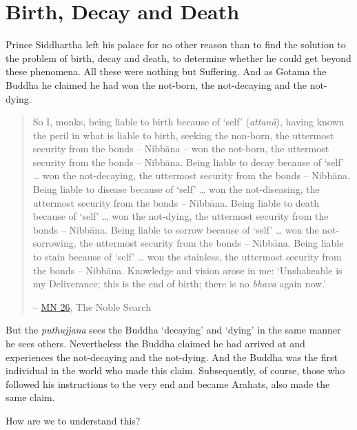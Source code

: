 \chapter{Birth, Decay and Death}

Prince Siddhartha left his palace for no other reason than to find the solution to the problem of birth, decay and death, to determine whether he could get beyond these phenomena. All these were nothing but Suffering. And as Gotama the Buddha he claimed he had won the not-born, the not-decaying and the not-dying.

\begin{quote}
So I, monks, being liable to birth because of `self' (\emph{attanā}), having known the peril in what is liable to birth, seeking the non-born, the uttermost security from the bonds -- Nibbāna -- won the not-born, the uttermost security from the bonds -- Nibbāna. Being liable to decay because of `self' \ldots\hspace{0pt} won the not-decaying, the uttermost security from the bonds -- Nibbāna. Being liable to disease because of `self' \ldots\hspace{0pt} won the not-diseasing, the uttermost security from the bonds -- Nibbāna. Being liable to death because of `self' \ldots\hspace{0pt} won the not-dying, the uttermost security from the bonds -- Nibbāna. Being liable to sorrow because of `self' \ldots\hspace{0pt} won the not-sorrowing, the uttermost security from the bonds -- Nibbāna. Being liable to stain because of `self' \ldots\hspace{0pt} won the stainless, the uttermost security from the bonds -- Nibbāna. Knowledge and vision arose in me: `Unshakeable is my Deliverance; this is the end of birth; there is no \emph{bhava} again now.'

 -- \href{https://suttacentral.net/mn26/en/bodhi}{MN 26}, The Noble Search
\end{quote}

But the \emph{puthujjana} sees the Buddha `decaying' and `dying' in the same manner he sees others. Nevertheless the Buddha claimed he had arrived at and experiences the not-decaying and the not-dying. And the Buddha was the first individual in the world who made this claim. Subsequently, of course, those who followed his instructions to the very end and became Arahats, also made the same claim.

How are we to understand this?

